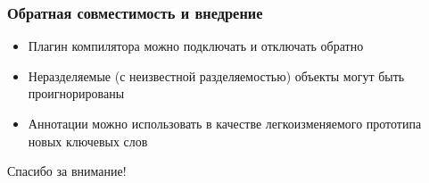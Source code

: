 \documentclass[14pt,xcolor={dvipsnames}]{beamer}
\begin{document}
\begin{frame}
\frametitle{Обратная совместимость и внедрение}
\begin{itemize}
  \item Плагин компилятора можно подключать и отключать обратно
  \item Неразделяемые (с неизвестной разделяемостью) объекты могут быть проигнорированы
  \item Аннотации можно использовать в качестве легкоизменяемого прототипа новых ключевых слов
\end{itemize}
\end{frame}

\begin{frame}
\begin{center}
Спасибо за внимание!
\end{center}
\end{frame}
\end{document}
